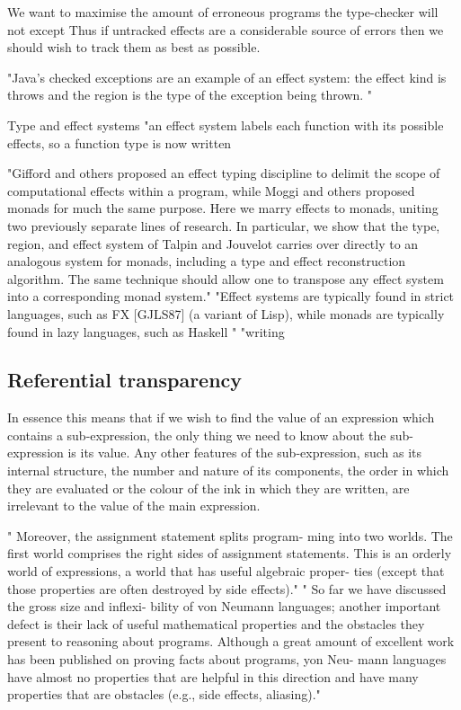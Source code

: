 We want to maximise the amount of erroneous programs the type-checker will not except
Thus if untracked effects are a considerable source of errors then we should
wish to track them as best as possible.

"Java's checked exceptions are an example of an effect system: the effect kind is throws and the region is the type of the exception being thrown.
"

Type and effect systems
\cite{nielson1999type}
"an effect system labels each function with its possible effects, so a function type is now written %

"Gifford and others proposed an effect typing discipline to delimit the scope of computational effects within a program, while Moggi and others proposed monads for much the same purpose. Here we marry effects to monads, uniting two previously separate lines of research. In particular, we show that the type, region, and effect system of Talpin and Jouvelot carries over directly to an analogous system for monads, including a type and effect reconstruction algorithm. The same technique should allow one to transpose any effect system into a corresponding monad system."
"Effect systems are typically found in strict languages, such as FX [GJLS87] (a variant of Lisp), while monads are typically found in lazy languages, such as Haskell "
"writing %
\cite{wadler2003marriage}

\subsection{Referential transparency}

In essence this means that if we wish to find the value of an expression which contains a sub-expression, the only thing we need to know about the sub-expression is its value. Any other features of the sub-expression, such as its internal structure, the number and nature of its components, the order in which they are evaluated or the colour of the ink in which they are written, are irrelevant to the value of the main expression.
\cite{strachey2000fundamental}

"
Moreover, the assignment statement splits program- ming into two worlds. The first world comprises the right sides of assignment statements. This is an orderly world of expressions, a world that has useful algebraic proper- ties (except that those properties are often destroyed by side effects)."
"
So far we have discussed the gross size and inflexi- bility of von Neumann languages; another important defect is their lack of useful mathematical properties and the obstacles they present to reasoning about programs. Although a great amount of excellent work has been published on proving facts about programs, yon Neu- mann languages have almost no properties that are helpful in this direction and have many properties that are obstacles (e.g., side effects, aliasing)."
\cite{backus2007can}


